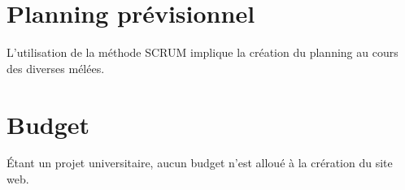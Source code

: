 \documentclass[oneside]{report}
\begin{document}
	\chapter{Planning prévisionnel}
	{
		\par L'utilisation de la méthode SCRUM implique la création du planning au cours des diverses mélées.
	}

	\chapter{Budget}
	{
		\par Étant un projet universitaire, aucun budget n'est alloué à la crération du site web.
	}
\end{document}
